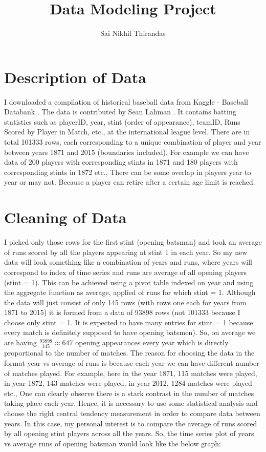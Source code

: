 \documentclass[a4paper, article, oneside, UKenglish]{memoir}
\title{Data Modeling Project}
\author{Sai Nikhil Thirandas}
\newcommand{\0}{\mathbf{0}}
\newcommand{\1}{\mathbf{1}}
\begin{document}
\projectfrontpage





\chapter{Description of Data}

I downloaded a compilation of historical baseball data from Kaggle - Baseball Databank \cite{BD}. The data is contributed by Sean Lahman \cite{BDB}. It contains batting statistics such as playerID, year, stint (order of appearance), teamID, Runs Scored by Player in Match, etc., at the international league level. There are in total 101333 rows, each corresponding to a unique combination of player and year between years 1871 and 2015 (boundaries included). For example we can have data of 200 players with corresponding stints in 1871 and 180 players with corresponding stints in 1872 etc., There can be some overlap in players year to year or may not. Because a player can retire after a certain age limit is reached.

\chapter{Cleaning of Data}

I picked only those rows for the first stint (opening batsman) and took an average of runs scored by all the players appearing at stint 1 in each year. So my new data will look something like a combination of years and runs, where years will correspond to index of time series and runs are average of all opening players (stint = 1). This can be achieved using a pivot table indexed on year and using the aggregate function as average, applied of runs for which stint = 1. Although the data will just consist of only 145 rows (with rows one each for years from 1871 to 2015) it is formed from a data of 93898 rows (not 101333 because I choose only stint = 1. It is expected to have many entries for stint = 1 because every match is definitely supposed to have opening batsmen). So, on average we are having $\frac{93898}{145} \approx 647$ opening appearances every year which is directly proportional to the number of matches. The reason for choosing the data in the format year vs average of runs is because each year we can have different number of matches played. For example, here in the year 1871, 115 matches were played, in year 1872, 143 matches were played, in year 2012, 1284 matches were played etc., One can clearly observe there is a stark contrast in the number of matches taking place each year. Hence, it is necessary to use some statistical analysis and choose the right central tendency measurement in order to compare data between years. In this case, my personal interest is to compare the average of runs scored by all opening stint players across all the years. So, the time series plot of years vs average runs of opening batsman would look like the below graph:
\end{document}
